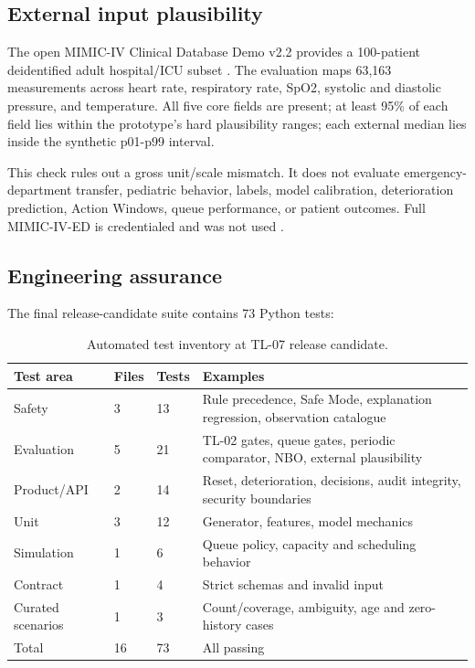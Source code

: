 \documentclass[11pt,a4paper]{article}
\begin{document}
\subsection{External input plausibility}

The open MIMIC-IV Clinical Database Demo v2.2 provides a 100-patient deidentified adult hospital/ICU subset \cite{mimicdemo}. The evaluation maps 63,163 measurements across heart rate, respiratory rate, SpO2, systolic and diastolic pressure, and temperature. All five core fields are present; at least 95\% of each field lies within the prototype's hard plausibility ranges; each external median lies inside the synthetic p01-p99 interval.

This check rules out a gross unit/scale mismatch. It does not evaluate emergency-department transfer, pediatric behavior, labels, model calibration, deterioration prediction, Action Windows, queue performance, or patient outcomes. Full MIMIC-IV-ED is credentialed and was not used \cite{mimiced}.

\subsection{Engineering assurance}

The final release-candidate suite contains 73 Python tests:

\begin{table}[H]
\centering
\caption{Automated test inventory at TL-07 release candidate.}
\small
\begin{tabularx}{\textwidth}{@{}L{28mm}C{11mm}C{12mm}Y@{}}
\toprule
Test area & Files & Tests & Examples \\
\midrule
Safety & 3 & 13 & Rule precedence, Safe Mode, explanation regression, observation catalogue \\
Evaluation & 5 & 21 & TL-02 gates, queue gates, periodic comparator, NBO, external plausibility \\
Product/API & 2 & 14 & Reset, deterioration, decisions, audit integrity, security boundaries \\
Unit & 3 & 12 & Generator, features, model mechanics \\
Simulation & 1 & 6 & Queue policy, capacity and scheduling behavior \\
Contract & 1 & 4 & Strict schemas and invalid input \\
Curated scenarios & 1 & 3 & Count/coverage, ambiguity, age and zero-history cases \\
\midrule
Total & 16 & 73 & All passing \\
\bottomrule
\end{tabularx}
\end{table}
\end{document}
